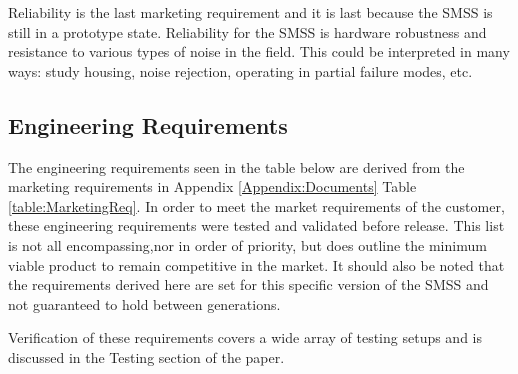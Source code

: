 \documentclass[journal]{IEEEtran}
\begin{document}
            Reliability is the last marketing requirement and it is last because the SMSS is still in a prototype state. Reliability for the SMSS is hardware robustness and resistance to various types of noise in the field. This could be interpreted in many ways: study housing, noise rejection, operating in partial failure modes, etc. 
        
    \subsection{Engineering Requirements}
        The engineering requirements seen in the table below are derived from the marketing requirements in Appendix \ref{Appendix:Documents} Table \ref{table:MarketingReq}. In order to meet the market requirements of the customer, these engineering requirements were tested and validated before release. This list is not all encompassing,nor in order of priority, but does outline the minimum viable product to remain competitive in the market. It should also be noted that the requirements derived here are set for this specific version of the SMSS and not guaranteed to hold between generations.
        
        Verification of these requirements covers a wide array of testing setups and is discussed in the Testing section of the paper. 
        
\end{document}
